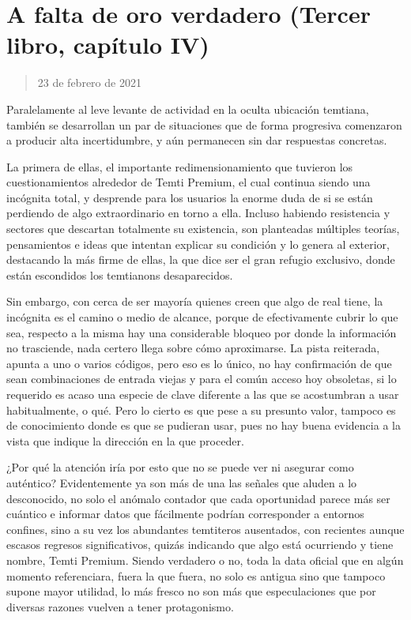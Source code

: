 \documentclass[
]{book}
\begin{document}
\hypertarget{a-falta-de-oro-verdadero-tercer-libro-capuxedtulo-iv}{%
\section{A falta de oro verdadero (Tercer libro, capítulo IV)}\label{a-falta-de-oro-verdadero-tercer-libro-capuxedtulo-iv}}

\begin{quote}
23 de febrero de 2021
\end{quote}

Paralelamente al leve levante de actividad en la oculta ubicación temtiana, también se desarrollan un par de situaciones que de forma progresiva comenzaron a producir alta incertidumbre, y aún permanecen sin dar respuestas concretas.

La primera de ellas, el importante redimensionamiento que tuvieron los cuestionamientos alrededor de Temti Premium, el cual continua siendo una incógnita total, y desprende para los usuarios la enorme duda de si se están perdiendo de algo extraordinario en torno a ella. Incluso habiendo resistencia y sectores que descartan totalmente su existencia, son planteadas múltiples teorías, pensamientos e ideas que intentan explicar su condición y lo genera al exterior, destacando la más firme de ellas, la que dice ser el gran refugio exclusivo, donde están escondidos los temtianons desaparecidos.

Sin embargo, con cerca de ser mayoría quienes creen que algo de real tiene, la incógnita es el camino o medio de alcance, porque de efectivamente cubrir lo que sea, respecto a la misma hay una considerable bloqueo por donde la información no trasciende, nada certero llega sobre cómo aproximarse. La pista reiterada, apunta a uno o varios códigos, pero eso es lo único, no hay confirmación de que sean combinaciones de entrada viejas y para el común acceso hoy obsoletas, si lo requerido es acaso una especie de clave diferente a las que se acostumbran a usar habitualmente, o qué. Pero lo cierto es que pese a su presunto valor, tampoco es de conocimiento donde es que se pudieran usar, pues no hay buena evidencia a la vista que indique la dirección en la que proceder.

¿Por qué la atención iría por esto que no se puede ver ni asegurar como auténtico? Evidentemente ya son más de una las señales que aluden a lo desconocido, no solo el anómalo contador que cada oportunidad parece más ser cuántico e informar datos que fácilmente podrían corresponder a entornos confines, sino a su vez los abundantes temtiteros ausentados, con recientes aunque escasos regresos significativos, quizás indicando que algo está ocurriendo y tiene nombre, Temti Premium. Siendo verdadero o no, toda la data oficial que en algún momento referenciara, fuera la que fuera, no solo es antigua sino que tampoco supone mayor utilidad, lo más fresco no son más que especulaciones que por diversas razones vuelven a tener protagonismo.
\end{document}

